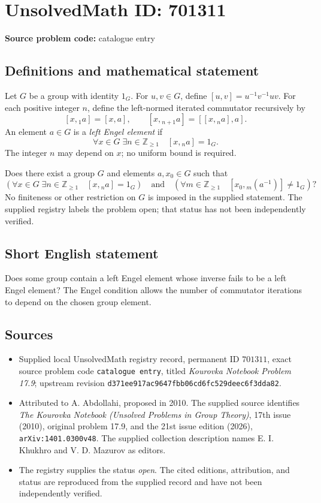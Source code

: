 \documentclass[11pt]{article}
\begin{document}
\section*{UnsolvedMath ID: 701311}
\textbf{Source problem code:} catalogue entry
\subsection{Definitions and mathematical statement}
Let \(G\) be a group with identity \(1_G\). For \(u,v\in G\), define \([u,v]=u^{-1}v^{-1}uv\). For each positive integer \(n\), define the left-normed iterated commutator recursively by
\[
[x,{}_1 a]=[x,a],\qquad [x,{}_{n+1}a]=[[x,{}_n a],a].
\]
An element \(a\in G\) is a \emph{left Engel element} if
\[
\forall x\in G\;\exists n\in\mathbb Z_{\geq 1}\quad [x,{}_n a]=1_G.
\]
The integer \(n\) may depend on \(x\); no uniform bound is required.

Does there exist a group \(G\) and elements \(a,x_0\in G\) such that
\[
\left(\forall x\in G\;\exists n\in\mathbb Z_{\geq 1}\quad [x,{}_n a]=1_G\right)
\quad\text{and}\quad
\left(\forall m\in\mathbb Z_{\geq 1}\quad [x_0,{}_m(a^{-1})]\neq 1_G\right)?
\]
No finiteness or other restriction on \(G\) is imposed in the supplied statement. The supplied registry labels the problem open; that status has not been independently verified.
\subsection{Short English statement}
Does some group contain a left Engel element whose inverse fails to be a left Engel element? The Engel condition allows the number of commutator iterations to depend on the chosen group element.
\subsection{Sources}
\begin{itemize}
\item Supplied local UnsolvedMath registry record, permanent ID \(701311\), exact source problem code \texttt{catalogue entry}, titled \emph{Kourovka Notebook Problem 17.9}; upstream revision \texttt{d371ee917ac9647fbb06cd6fc529deec6f3dda82}.
\item Attributed to A. Abdollahi, proposed in 2010. The supplied source identifies \emph{The Kourovka Notebook (Unsolved Problems in Group Theory)}, 17th issue (2010), original problem 17.9, and the 21st issue edition (2026), \texttt{arXiv:1401.0300v48}. The supplied collection description names E. I. Khukhro and V. D. Mazurov as editors.
\item The registry supplies the status \emph{open}. The cited editions, attribution, and status are reproduced from the supplied record and have not been independently verified.
\end{itemize}
\end{document}
